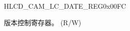 \begin{register}{H}{LCD\_CAM\_LC\_DATE\_REG}{0x00FC}\label{regdesc:LCDCAMLCREGDATEREG}
%
%
\regnewline%
\begin{regdesc}\begin{reglist}
\label{fielddesc:LCDCAMLCDATE}\item [LCD\_CAM\_LC\_DATE] 版本控制寄存器。 (R/W)
\end{reglist}\end{regdesc}
\end{register}
